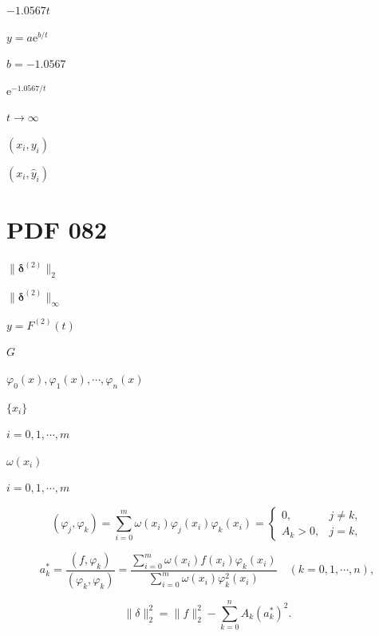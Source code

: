 \documentclass[UTF8,fontset=fandol,a4paper]{ctexart}
\begin{document}
\noindent $-1.0567t$\par

\noindent $y=a\mathrm e^{b/t}$\par

\noindent $b=-1.0567$\par

\noindent $\mathrm e^{-1.0567/t}$\par

\noindent $t\to\infty$\par

\noindent $(x_i,y_i)$\par

\noindent $(x_i,\hat y_i)$\par

\section*{PDF 082}

\noindent $\|\boldsymbol\delta^{(2)}\|_2$\par

\noindent $\|\boldsymbol\delta^{(2)}\|_\infty$\par

\noindent $y=F^{(2)}(t)$\par

\noindent $G$\par

\noindent $\varphi_0(x),\varphi_1(x),\cdots,\varphi_n(x)$\par

\noindent $\{x_i\}$\par

\noindent $i=0,1,\cdots,m$\par

\noindent $\omega(x_i)$\par

\noindent $i=0,1,\cdots,m$\par

\[
(\varphi_j,\varphi_k)=\sum_{i=0}^m\omega(x_i)\varphi_j(x_i)\varphi_k(x_i)=\begin{cases}0,&j\ne k,\\ A_k>0,&j=k,\end{cases}\tag{3.6.8}
\]

\[
a_k^*=\frac{(f,\varphi_k)}{(\varphi_k,\varphi_k)}=\frac{\displaystyle\sum_{i=0}^m\omega(x_i)f(x_i)\varphi_k(x_i)}{\displaystyle\sum_{i=0}^m\omega(x_i)\varphi_k^2(x_i)}\quad(k=0,1,\cdots,n),\tag{3.6.9}
\]

\[
\|\delta\|_2^2=\|f\|_2^2-\sum_{k=0}^n A_k(a_k^*)^2.
\]
\end{document}
